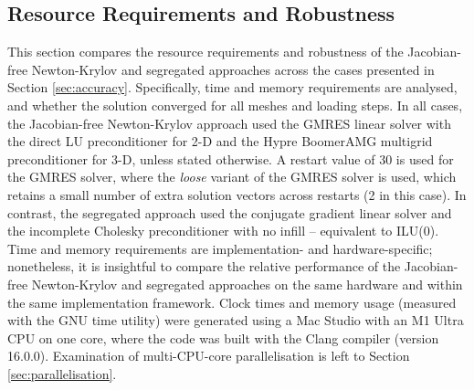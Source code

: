 \documentclass[sn-mathphys,Numbered]{sn-jnl}%
\begin{document}
\subsection{Resource Requirements and Robustness}
\label{sec:resource_requirements}
This section compares the resource requirements and robustness of the Jacobian-free Newton-Krylov and segregated approaches across the cases presented in Section \ref{sec:accuracy}.
Specifically, time and memory requirements are analysed, and whether the solution converged for all meshes and loading steps.
In all cases, the Jacobian-free Newton-Krylov approach used the GMRES linear solver with the direct LU preconditioner for 2-D and the Hypre BoomerAMG multigrid preconditioner for 3-D, unless stated otherwise.
A restart value of 30 is used for the GMRES solver, where the \emph{loose} variant of the GMRES solver is used, which retains a small number of extra solution vectors across restarts (2 in this case).
In contrast, the segregated approach used the conjugate gradient linear solver and the incomplete Cholesky preconditioner with no infill -- equivalent to ILU(0).
Time and memory requirements are implementation- and hardware-specific; nonetheless, it is insightful to compare the relative performance of the Jacobian-free Newton-Krylov and segregated approaches on the same hardware and within the same implementation framework.
Clock times and memory usage (measured with the GNU time utility) were generated using a Mac Studio with an M1 Ultra CPU on one core, where the code was built with the Clang compiler (version 16.0.0).
Examination of multi-CPU-core parallelisation is left to Section \ref{sec:parallelisation}.
\end{document}
